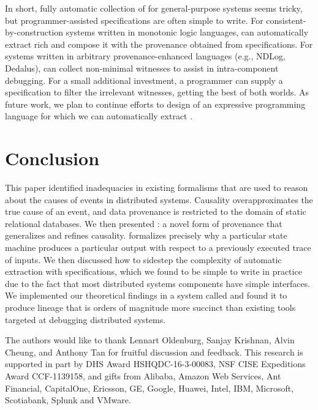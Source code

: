 In short, fully automatic collection of \watprovenance{} for general-purpose
systems seems tricky, but programmer-assisted \watprovenance{} specifications
are often simple to write.  For consistent-by-construction systems written in
monotonic logic languages, \fluent{} can automatically extract rich
\watprovenance{} and compose it with the provenance obtained from
\watprovenance{} specifications.  For systems written in arbitrary
provenance-enhanced languages (e.g., NDLog, Dedalus), \fluent{} can collect
non-minimal witnesses to assist in intra-component debugging. For a small
additional investment, a programmer can supply a \watprovenance{} specification
to filter the irrelevant witnesses, getting the best of both worlds. As future
work, we plan to continue efforts to design of an expressive programming
language for which we can automatically extract \watprovenance{}.


\section{Conclusion}
This paper identified inadequacies in existing formalisms that are used to
reason about the causes of events in distributed systems. Causality
overapproximates the true cause of an event, and data provenance is restricted
to the domain of static relational databases.  We then presented
\watprovenance{}: a novel form of provenance that generalizes \whyprovenance{}
and refines causality. \Watprovenance{} formalizes precisely why a particular
state machine produces a particular output with respect to a previously
executed trace of inputs. We then discussed how to sidestep the complexity of
automatic \watprovenance{} extraction with \watprovenance{} specifications,
which we found to be simple to write in practice due to the fact that most
distributed systems components have simple interfaces. We implemented our
theoretical findings in a system called \fluent{} and found it to produce
lineage that is orders of magnitude more succinct than existing tools targeted
at debugging distributed systems.

\begin{acks}
  The authors would like to thank Lennart Oldenburg, Sanjay Krishnan, Alvin
  Cheung, and Anthony Tan for fruitful discussion and feedback.
  This research is supported in part by DHS Award HSHQDC-16-3-00083, NSF CISE
  Expeditions Award CCF-1139158, and gifts from Alibaba, Amazon Web Services, Ant
  Financial, CapitalOne, Ericsson, GE, Google, Huawei, Intel, IBM, Microsoft,
  Scotiabank, Splunk and VMware.
\end{acks}
